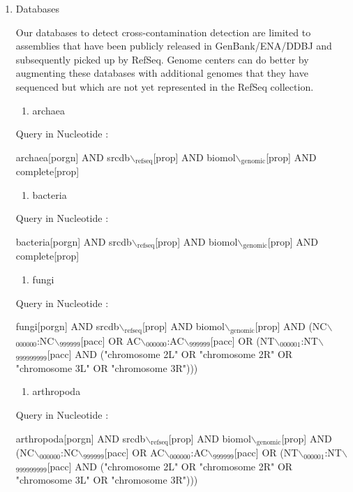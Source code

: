\documentclass[11pt]{article}
\begin{document}
\begin{enumerate}
\item Databases
\label{sec:orgb02c85f}


Our databases to detect cross-contamination detection are limited to
assemblies that have been publicly released in GenBank/ENA/DDBJ and
subsequently picked up by RefSeq. Genome centers can do better by
augmenting these databases with additional genomes that they have
sequenced but which are not yet represented in the RefSeq collection.

\begin{enumerate}
\item archaea
\end{enumerate}

Query in Nucleotide :

archaea[porgn] AND srcdb$\backslash$\(_{\text{refseq}}\)[prop] AND biomol$\backslash$\(_{\text{genomic}}\)[prop] AND
complete[prop]

\begin{enumerate}
\item bacteria
\end{enumerate}

Query in Nucleotide :

bacteria[porgn] AND srcdb$\backslash$\(_{\text{refseq}}\)[prop] AND biomol$\backslash$\(_{\text{genomic}}\)[prop] AND
complete[prop]

\begin{enumerate}
\item fungi
\end{enumerate}

Query in Nucleotide :

fungi[porgn] AND srcdb$\backslash$\(_{\text{refseq}}\)[prop] AND biomol$\backslash$\(_{\text{genomic}}\)[prop] AND
(NC$\backslash$\(_{\text{000000}}\):NC$\backslash$\(_{\text{999999}}\)[pacc] OR AC$\backslash$\(_{\text{000000}}\):AC$\backslash$\(_{\text{999999}}\)[pacc] OR
(NT$\backslash$\(_{\text{000001}}\):NT$\backslash$\(_{\text{999999999}}\)[pacc] AND ("chromosome 2L" OR "chromosome 2R"
OR "chromosome 3L" OR "chromosome 3R")))

\begin{enumerate}
\item arthropoda
\end{enumerate}

Query in Nucleotide :

arthropoda[porgn] AND srcdb$\backslash$\(_{\text{refseq}}\)[prop] AND biomol$\backslash$\(_{\text{genomic}}\)[prop] AND
(NC$\backslash$\(_{\text{000000}}\):NC$\backslash$\(_{\text{999999}}\)[pacc] OR AC$\backslash$\(_{\text{000000}}\):AC$\backslash$\(_{\text{999999}}\)[pacc] OR
(NT$\backslash$\(_{\text{000001}}\):NT$\backslash$\(_{\text{999999999}}\)[pacc] AND ("chromosome 2L" OR "chromosome 2R"
OR "chromosome 3L" OR "chromosome 3R")))


\end{enumerate}
\end{document}
